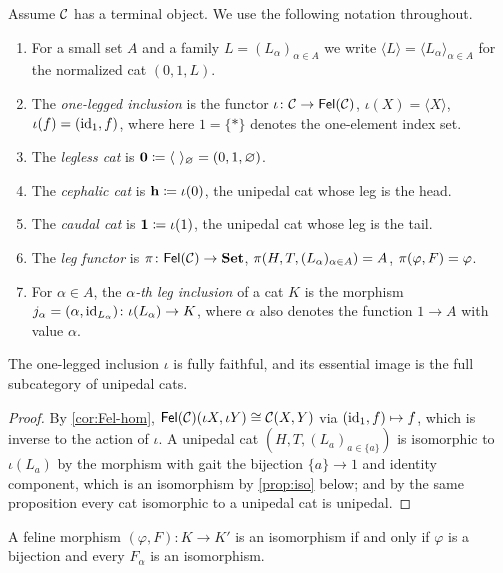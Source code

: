 \begin{notation}\label{not:standard}
Assume $\mathcal{C}$ has a terminal object. We use the following notation throughout.
\begin{enumerate}
\item For a small set $A$ and a family $L=(L_\alpha)_{\alpha\in A}$ we write
  $\langle L\rangle=\langle L_\alpha\rangle_{\alpha\in A}$ for the normalized
  cat $(0,1,L)$.
\item The \emph{one-legged inclusion} is the functor $\iota\colon\mathcal{C}\to\mathsf{Fel}(\mathcal{C})$,
  $\iota(X)=\langle X\rangle$, $\iota(f)=(\mathrm{id}_1,f)$, where here $1=\{*\}$
  denotes the one-element index set.
\item The \emph{legless cat} is $\Legless\defeq\langle\ \rangle_{\varnothing}=(0,1,\varnothing)$.
\item The \emph{cephalic cat} is $\mathbf{h}\coloneqq\iota(0)$, the unipedal cat whose
  leg is the head.
\item The \emph{caudal cat} is $\mathbf{1}\coloneqq\iota(1)$, the unipedal cat whose
  leg is the tail.
\item The \emph{leg functor} is $\pi\colon\mathsf{Fel}(\mathcal{C})\to\mathbf{Set}$,
  $\pi(H,T,(L_\alpha)_{\alpha\in A})=A$, $\pi(\varphi,F)=\varphi$.
\item For $\alpha\in A$, the \emph{$\alpha$-th leg inclusion} of a cat $K$ is
  the morphism $j_\alpha=(\alpha,\mathrm{id}_{L_\alpha})\colon\iota(L_\alpha)\to K$, where
  $\alpha$ also denotes the function $1\to A$ with value $\alpha$.
\end{enumerate}
\end{notation}

\begin{proposition}\label{prop:iota-ff}
The one-legged inclusion $\iota$ is fully faithful, and its essential image
is the full subcategory of unipedal cats.
\end{proposition}

\begin{proof}
By \cref{cor:Fel-hom}, $\mathsf{Fel}(\mathcal{C})(\iota X,\iota Y)\cong\mathcal{C}(X,Y)$ via
$(\mathrm{id}_1,f)\mapsto f$, which is inverse to the action of $\iota$. A unipedal
cat $(H,T,(L_a)_{a\in\{a\}})$ is isomorphic to $\iota(L_a)$ by the morphism
with gait the bijection $\{a\}\to1$ and identity component, which is an
isomorphism by \cref{prop:iso} below; and by the same proposition every cat
isomorphic to a unipedal cat is unipedal.
\end{proof}

\begin{proposition}\label{prop:iso}
A feline morphism $(\varphi,F)\colon K\to K'$ is an isomorphism if and only if
$\varphi$ is a bijection and every $F_\alpha$ is an isomorphism.
\end{proposition}

